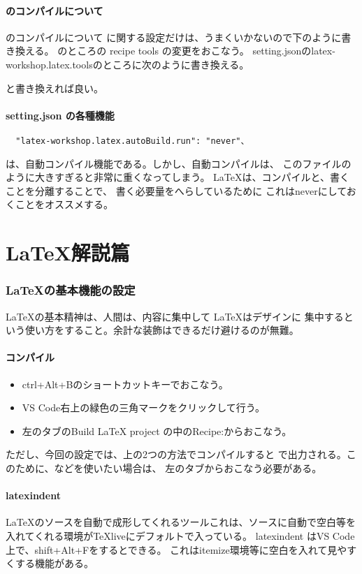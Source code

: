 \documentclass{ltjsarticle}
\begin{document}
\subsection{\pLaTeX のコンパイルについて}
\pLaTeX のコンパイルについて
\pLaTeX に関する設定だけは、うまくいかないので下のように書き換える。
\pLaTeX  のところの
recipe tools の変更をおこなう。
setting.jsonのlatex-workshop.latex.toolsのところに次のように書き換える。

と書き換えれば良い。
\subsection{setting.json の各種機能}
\begin{verbatim}
  "latex-workshop.latex.autoBuild.run": "never"、
\end{verbatim}
は、自動コンパイル機能である。しかし、自動コンパイルは、
このファイルのように大きすぎると非常に重くなってしまう。
\LaTeX は、コンパイルと、書くことを分離することで、
書く必要量をへらしているために
これはneverにしておくことをオススメする。

\part{\LaTeX 解説篇}
\section{\LaTeX の基本機能の設定}
\LaTeX の基本精神は、人間は、内容に集中して \LaTeX はデザインに
集中するという使い方をすること。余計な装飾はできるだけ避けるのが無難。
\subsection{コンパイル}
\begin{itemize}
  \item ctrl+Alt+Bのショートカットキーでおこなう。
  \item VS Code右上の緑色の三角マークをクリックして行う。
  \item 左のタブのBuild LaTeX project の中のRecipe:からおこなう。
\end{itemize}
ただし、今回の設定では、上の2つの方法でコンパイルすると\LuaLaTeX
で出力される。このために、\upLaTeX などを使いたい場合は、
左のタブからおこなう必要がある。
\subsection{latexindent}
\LaTeX のソースを自動で成形してくれるツールこれは、ソースに自動で空白等を
入れてくれる環境がTeXliveにデフォルトで入っている。
latexindent はVS Code上で、shift+Alt+Fをするとできる。
これはitemize環境等に空白を入れて見やすくする機能がある。
\end{document}
